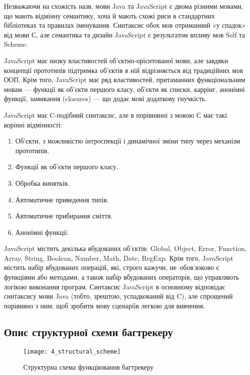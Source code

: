 \documentclass[../main.tex]{subfiles}
\begin{document}
		Незважаючи на схожість назв, мови Java та JavaScript є двома різними мовами, що мають відмінну семантику, хоча й мають схожі риси в стандартних бібліотеках та правилах іменування. Синтаксис обох мов отриманний «у спадок» від мови С, але семантика та дизайн JavaScript є результатом впливу мов Self та Scheme.
		
		JavaScript має низку властивостей об'єктно-орієнтованої мови, але завдяки концепції прототипів підтримка об'єктів в ній відрізняється від традиційних мов ООП. Крім того, JavaScript має ряд властивостей, притаманних функціональним мовам — функції як об'єкти першого класу, об'єкти як списки, каррінг, анонімні функції, замикання (closures) — що додає мові додаткову гнучкість.
		
		JavaScript має C-подібний синтаксис, але в порівнянні з мовою С має такі корінні відмінності:
		\begin{enumerate}
			\item Об'єкти, з можливістю інтроспекції і динамічної зміни типу через механізм прототипів.
			\item Функції як об'єкти першого класу.
			\item Обробка винятків.
			\item Автоматичне приведення типів.
			\item Автоматичне прибирання сміття.
			\item Анонімні функції.
		\end{enumerate}
		
		JavaScript містить декілька вбудованих об'єктів: Global, Object, Error, Function, Array, String, Boolean, Number, Math, Date, RegExp. Крім того, JavaScript містить набір вбудованих операцій, які, строго кажучи, не~обов'язково є функціями або методами, а також набір вбудованих операторів, що управляють логікою виконання програм. Синтаксис JavaScript в основному відповідає синтаксису мови Java (тобто, зрештою, успадкований від C), але спрощений порівняно з ним, щоб зробити мову сценаріїв легкою для вивчення.
	
	\subsection{Опис структурної схеми багтрекеру}
		\begin{figure}[H]
			\centering
			\texttt{[image: 4\_structural\_scheme]}
			\caption{Структурна схема функціювання багтрекеру}
			\label{structural_scheme}
		\end{figure}
	
\end{document}
